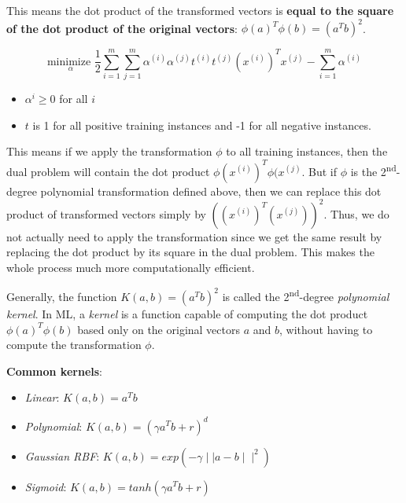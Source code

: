 \documentclass[letterpaper]{article}
\begin{document}
This means the dot product of the transformed vectors is \textbf{equal to the square of the dot product of the original vectors}: $\phi(a)^{T}\phi(b) = (a^{T}b)^{2}$. 

\newpage
$$ 
\underset{\alpha}{\text{minimize }} \frac{1}{2} \sum_{i=1}^{m} \sum_{j=1}^{m} \alpha^{(i)} \alpha^{(j)} t^{(i)} t^{(j)} (x^{(i)})^{T}x^{(j)} - \sum_{i=1}^{m} \alpha^{(i)}
$$
\begin{itemize}
	\item $\alpha^{i} \geq 0$ for all $i$
	\item $t$ is 1 for all positive training instances and -1 for all negative instances. 
\end{itemize} 

This means if we apply the transformation $\phi$ to all training instances, then the dual problem will contain the dot product $\phi(x^{(i)})^{T}\phi(x^{(j)}$. But if $\phi$ is the 2\textsuperscript{nd}-degree polynomial transformation defined above, then we can replace this dot product of transformed vectors simply by $((x^{(i)})^{T}(x^{(j)}))^{2}$. Thus, we do not actually need to apply the transformation since we get the same result by replacing the dot product by its square in the dual problem. This makes the whole process much more computationally efficient. 

Generally, the function $K(a, b) = (a^{T}b)^{2}$ is called the 2\textsuperscript{nd}-degree \textsl{polynomial kernel}. In ML, a \textsl{kernel} is a function capable of computing the dot product $\phi(a)^{T}\phi(b)$ based only on the original vectors $a$ and $b$, without having to compute the transformation $\phi$. 

\textbf{Common kernels}: 
\begin{itemize}
	\item \textsl{Linear}: $K(a, b) = a^{T}b $
	\item \textsl{Polynomial}: $K(a, b) = (\gamma a^{T} b + r)^{d}$ 
	\item \textsl{Gaussian RBF}: $K(a, b) = exp(-\gamma \mid \mid a - b \mid \mid^{2})$
	\item \textsl{Sigmoid}: $K(a, b) = tanh(\gamma a^{T}b + r)$
\end{itemize}
\end{document}
